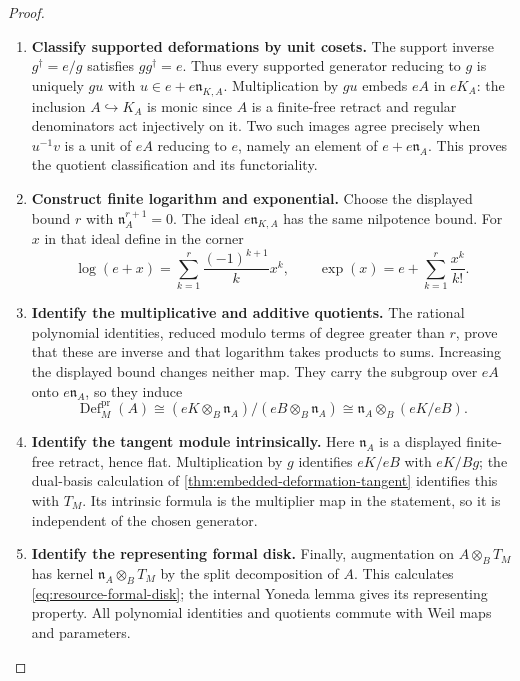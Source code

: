 \documentclass[11pt,a4paper]{article}
\numberwithin{algorithm}{section}
\numberwithin{equation}{section}
\theoremstyle{definition}
\theoremstyle{remark}
\theoremstyle{plain}
\newcommand{\incl}{\hookrightarrow}
\theoremstyle{definition}
\theoremstyle{plain}
\begin{document}
\begin{proof}\leavevmode
\begin{enumerate}[leftmargin=*,align=left]
\item \textbf{Classify supported deformations by unit cosets.}
The support inverse $g^\dagger=e/g$ satisfies $gg^\dagger=e$.
Thus every supported generator reducing to $g$ is uniquely $gu$
with $u\in e+e\mathfrak n_{K,A}$. Multiplication by $gu$ embeds
$eA$ in $eK_A$: the inclusion $A\incl K_A$ is monic since $A$
is a finite-free retract and regular denominators act injectively
on it. Two such images agree precisely when $u^{-1}v$ is a unit
of $eA$ reducing to $e$, namely an element of $e+e\mathfrak n_A$.
This proves the quotient classification and its functoriality.

\item \textbf{Construct finite logarithm and exponential.}
Choose the displayed bound $r$ with $\mathfrak n_A^{r+1}=0$.
The ideal $e\mathfrak n_{K,A}$ has the same nilpotence bound.
For $x$ in that ideal define in the corner
\[
 \log(e+x)=\sum_{k=1}^r\frac{(-1)^{k+1}}k x^k,
 \qquad \exp(x)=e+\sum_{k=1}^r\frac{x^k}{k!}.
\]

\item \textbf{Identify the multiplicative and additive quotients.}
The rational polynomial identities, reduced modulo terms of degree
greater than $r$, prove that these are inverse and that logarithm
takes products to sums. Increasing the displayed bound changes
neither map. They carry the subgroup over $eA$ onto
$e\mathfrak n_A$, so they induce
\[
 \operatorname{Def}^{\mathrm{pr}}_M(A)
 \cong (eK\otimes_B\mathfrak n_A)/(eB\otimes_B\mathfrak n_A)
 \cong\mathfrak n_A\otimes_B(eK/eB).
\]

\item \textbf{Identify the tangent module intrinsically.}
Here $\mathfrak n_A$ is a displayed finite-free retract, hence
flat. Multiplication by $g$ identifies $eK/eB$ with $eK/Bg$;
the dual-basis calculation of
\cref{thm:embedded-deformation-tangent} identifies this with $T_M$.
Its intrinsic formula is the multiplier map in the statement,
so it is independent of the chosen generator.

\item \textbf{Identify the representing formal disk.}
Finally, augmentation on $A\otimes_BT_M$ has kernel
$\mathfrak n_A\otimes_BT_M$ by the split decomposition of $A$.
This calculates \eqref{eq:resource-formal-disk}; the internal
Yoneda lemma gives its representing property. All polynomial
identities and quotients commute with Weil maps and parameters.
\end{enumerate}
\end{proof}
\end{document}
